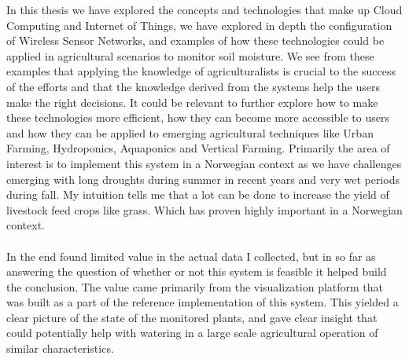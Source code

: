 \documentclass[]{uiophd}
\begin{document}
In this thesis we have explored the concepts and technologies that make up Cloud Computing and Internet of Things, we have explored in depth the configuration of Wireless Sensor Networks, and examples of how these technologies could be applied in agricultural scenarios to monitor soil moisture. We see from these examples that applying the knowledge of agriculturalists is crucial to the success of the efforts and that the knowledge derived from the systems help the users make the right decisions. It could be relevant to further explore how to make these technologies more efficient, how they can become more accessible to users and how they can be applied to emerging agricultural techniques like Urban Farming, Hydroponics, Aquaponics and Vertical Farming. Primarily the area of interest is to implement this system in a Norwegian context as we have challenges emerging with long droughts during summer in recent years and very wet periods during fall. My intuition tells me that a lot can be done to increase the yield of livestock feed crops like grass. Which has proven highly important in a Norwegian context.
\\\\
In the end found limited value in the actual data I collected, but in so far as answering the question of whether or not this system is feasible it helped build the conclusion. The value came primarily from the visualization platform that was built as a part of the reference implementation of this system. This yielded a clear picture of the state of the monitored plants, and gave clear insight that could potentially help with watering in a large scale agricultural operation of similar characteristics.
\end{document}
